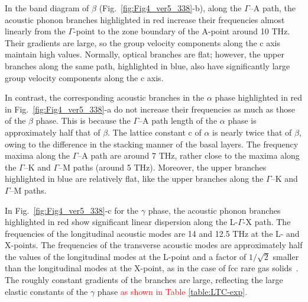 \documentclass[twocolumn,amsmath,amssymb,a4paper,prb,superscriptaddress,floatfix]{revtex4-1}
\begin{document}
In the band diagram of $\beta$ (Fig.~\ref{fig:Fig4_ver5_338}-b), along
the $\Gamma$--A path, the acoustic phonon branches highlighted in red
increase their frequencies almost linearly from the $\Gamma$-point to
the zone boundary of the A-point around 10 THz. Their gradients are
large, so the group velocity components along the c axis maintain high
values. Normally, optical branches are flat; however, the upper branches
along the same path, highlighted in blue, also have significantly large
group velocity components along the c axis.

In contrast, the corresponding acoustic branches in the $\alpha$ phase
highlighted in red in Fig.~\ref{fig:Fig4_ver5_338}-a do not increase
their frequencies as much as those of the $\beta$ phase. This is because
the $\Gamma$--A path length of the $\alpha$ phase is approximately half
that of $\beta$. The lattice constant c of $\alpha$ is nearly twice that
of $\beta$, owing to the difference in the stacking manner of the basal
layers. The frequency maxima along the $\Gamma$--A path are around 7 THz,
rather close to the maxima along the $\Gamma$--K and $\Gamma$--M paths
(around 5 THz). Moreover, the upper branches highlighted in blue are
relatively flat, like the upper branches along the $\Gamma$--K and
$\Gamma$--M paths.


In Fig.~\ref{fig:Fig4_ver5_338}-c for the $\gamma$ phase, the acoustic phonon branches
highlighted in red show significant linear dispersion along the
L-$\Gamma$-X path. The frequencies of the longitudinal acoustic modes
are 14 and 12.5 THz at the L- and X-points. The frequencies of the
transverse acoustic modes are approximately half the values of the
longitudinal modes at the L-point and a factor of $1/\sqrt{2}$ smaller
than the longitudinal modes at the X-point, as in the case of fcc rare
gas solids~\cite{dove-p30}. The roughly constant gradients of the branches are large,
reflecting the large elastic constants of the $\gamma$ phase
\textcolor{red}{as shown in Table \ref{table:LTC-exp}.} 
%
\end{document}
